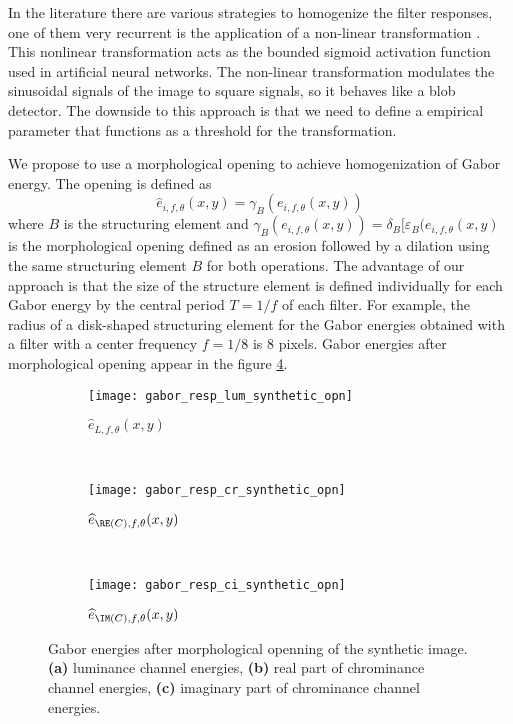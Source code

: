 In the literature there are various strategies to homogenize the filter responses, one of them very recurrent is the application of a non-linear transformation \citep{Jain.Farrokhnia:IJPR:1991}. This nonlinear transformation acts as the bounded sigmoid activation function used in artificial neural networks. The non-linear transformation modulates the sinusoidal signals of the image to square signals, so it behaves like a blob detector. The downside to this approach is that we need to define a empirical parameter that functions as a threshold for the transformation.

We propose to use a morphological opening to achieve homogenization of Gabor energy. The opening is defined as
\begin{equation}\label{eq:gabor_energy_opn}
	\widehat{e}_{i, f, \theta}(x,y) = \gamma_B(e_{i, f, \theta}(x,y)) 
\end{equation}
where $B$ is the structuring element and $\gamma_B(e_{i, f, \theta}(x,y)) = \delta_B[\varepsilon_B(e_{i, f, \theta}(x,y)$ is the morphological opening defined as an erosion followed by a dilation using the same structuring element $B$ for both operations. The advantage of our approach is that the size of the structure element is defined individually for each Gabor energy by the central period $ T=1 / f $ of each filter. For example, the radius of a disk-shaped structuring element for the Gabor energies obtained with a filter with a center frequency $ f = 1/8 $ is 8 pixels. Gabor energies after morphological opening appear in the figure \ref{fig:synthetic_img_gresponses_opn}.

\begin{figure}[!ht]
    \centering
    \begin{subfigure}[b]{\textwidth}   
        \texttt{[image: gabor\_resp\_lum\_synthetic\_opn]}
        \caption{$\widehat{e}_{L, f, \theta}(x,y)$} 
        \label{fig:lum_gabor_energies_opn}
    \end{subfigure} \\ [2ex]   
    \begin{subfigure}[b]{\textwidth}   
    	\texttt{[image: gabor\_resp\_cr\_synthetic\_opn]}
    	\caption{$\widehat{e}_{\RE(C), f, \theta}(x,y)$}
        \label{fig:cr_gabor_energie_opn}
    \end{subfigure} \\ [2ex]    	
    \begin{subfigure}[b]{\textwidth}  
        \texttt{[image: gabor\_resp\_ci\_synthetic\_opn]}
        \caption{$\widehat{e}_{\IM(C), f, \theta}(x,y)$}
        \label{fig:ci_gabor_energies_opn} 
    \end{subfigure} 
    	    
    \caption{Gabor energies after morphological openning of the synthetic image. \small\textbf{\textsf{(a)}} luminance channel energies, \small\textbf{\textsf{(b)}} real part of chrominance channel energies, \small\textbf{\textsf{(c)}} imaginary part of chrominance channel energies.}\label{fig:synthetic_img_gresponses_opn}    
\end{figure}

